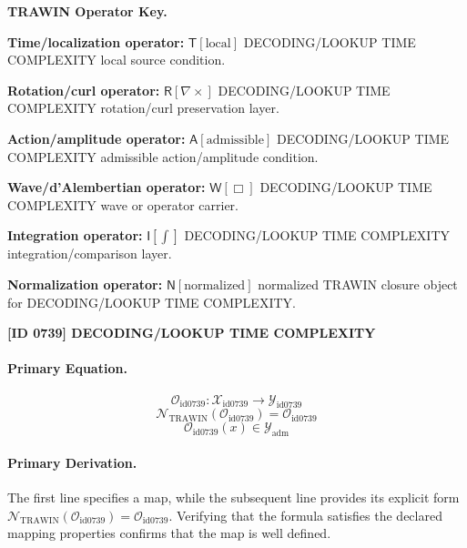\par\vspace{0.45\baselineskip}
\noindent\begin{minipage}[t]{\linewidth}
\begingroup
\small
\raggedright
\textbf{TRAWIN Operator Key.}\par
\noindent\textbf{Time/localization operator:} $\mathsf{T}\!\left[\mathrm{local}\right]$ DECODING/LOOKUP TIME COMPLEXITY local source condition.\par
\noindent\textbf{Rotation/curl operator:} $\mathsf{R}\!\left[\nabla\times\right]$ DECODING/LOOKUP TIME COMPLEXITY rotation/curl preservation layer.\par
\noindent\textbf{Action/amplitude operator:} $\mathsf{A}\!\left[\mathrm{admissible}\right]$ DECODING/LOOKUP TIME COMPLEXITY admissible action/amplitude condition.\par
\noindent\textbf{Wave/d'Alembertian operator:} $\mathsf{W}\!\left[\Box\right]$ DECODING/LOOKUP TIME COMPLEXITY wave or operator carrier.\par
\noindent\textbf{Integration operator:} $\mathsf{I}\!\left[\int\right]$ DECODING/LOOKUP TIME COMPLEXITY integration/comparison layer.\par
\noindent\textbf{Normalization operator:} $\mathsf{N}\!\left[\mathrm{normalized}\right]$ normalized TRAWIN closure object for DECODING/LOOKUP TIME COMPLEXITY.\par
\endgroup
\end{minipage}

\clearpage
\noindent\textbf{[ID 0739] DECODING/LOOKUP TIME COMPLEXITY}\par
\vspace{0.35em}
\paragraph{Primary Equation.}
\[
\mathcal{O}_{\mathrm{id0739}}:\mathcal{X}_{\mathrm{id0739}}\longrightarrow\mathcal{Y}_{\mathrm{id0739}}
\]
\[
\mathcal{N}_{\mathrm{TRAWIN}}(\mathcal{O}_{\mathrm{id0739}})=\mathcal{O}_{\mathrm{id0739}}
\]
\[
\mathcal{O}_{\mathrm{id0739}}(x)\in\mathcal{Y}_{\mathrm{adm}}
\]

\paragraph{Primary Derivation.}
The first line specifies a map, while the subsequent line provides its explicit form \( \mathcal{N}_{\mathrm{TRAWIN}}(\mathcal{O}_{\mathrm{id0739}})=\mathcal{O}_{\mathrm{id0739}} \). Verifying that the formula satisfies the declared mapping properties confirms that the map is well defined.
